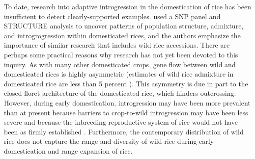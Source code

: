\documentclass[11pt]{article}
\begin{document}
\begin{enumerate}
To date, research into adaptive introgression in the domestication of rice has been insufficient to detect clearly-supported examples.
\cite{zhao2010genomic} used a SNP panel and STRUCTURE analysis to uncover patterns of population structure, admixture, and introgrogression within domesticated rices, and the authors emphasize the importance of similar research that includes wild rice accessions.
There are perhaps some practical reasons why research has not yet been devoted to this inquiry.
As with many other domesticated crops, gene flow between wild and domesticated rices is highly asymmetric (estimates of wild rice admixture in domesticated rice are less than 5 percent \cite{wang2017asian}).
This asymmetry is due in part to the closed floret architecture of the domesticated rice, which hinders outcrossing.
However, during early domestication, introgression may have been more prevalent than at present because barriers to crop-to-wild introgression may have been less severe and because the inbreeding reproductive system of rice would not have been as firmly established \cite{vaughan2008evolving}.
Furthermore, the contemporary distribution of wild rice does not capture the range and diversity of wild rice during early domestication and range expansion of rice.











\end{enumerate}

	

	
	
	
	
	
	
	
	
\end{document}

